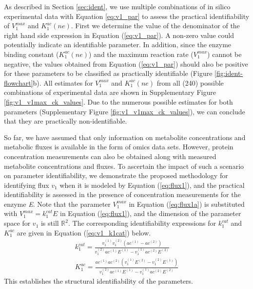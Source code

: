 \documentclass[10pt]{article}
\begin{document}
	As described in Section \ref{sec:ident}, we use multiple combinations of in silico experimental data with Equation \ref{eq:v1_par} to assess the practical identifiability of $V_1^{max}$ and $K_1^{ac} (ne)$. First we determine the value of the denominator of the right hand side expression in Equation (\ref{eq:v1_par}). A non-zero value could potentially indicate an identifiable parameter. In addition, since the enzyme binding constant ($K_1^{ac}(ne)$) and the maximum reaction rate ($V_1^{max}$) cannot be negative, the values obtained from Equation (\ref{eq:v1_par}) should also be positive for these parameters to be classified as practically identifiable (Figure \ref{fig:ident-flowchart}b). All estimates for $V_1^{max}$ and $K_1^{ac} (ne)$ from all (240) possible combinations of experimental data are shown in Supplementary Figure \ref{fig:v1_v1max_ck_values}. Due to the numerous possible estimates for both parameters (Supplementary Figure \ref{fig:v1_v1max_ck_values}), we can conclude that they are practically non-identifiable. 
	
	So far, we have assumed that only information on metabolite concentrations and metabolic fluxes is available in the form of omics data sets. However, protein concentration measurements can also be obtained along with measured metabolite concentrations and fluxes. To ascertain the impact of such a scenario on parameter identifiability, we demonstrate the proposed methodology for identifying flux $v_1$ when it is modeled by Equation (\ref{eq:flux1}), and the practical identifiability is assessed in the presence of concentration measurements for the enzyme \textit{E}. Note that the parameter $V_1^{max}$ in Equation (\ref{eq:flux1a}) is substituted with $V_1^{max} = k_1^{cat}E$ in Equation (\ref{eq:flux1}), and the dimension of the parameter space for $v_1$ is still $\mathbb{R}^2$. The corresponding identifiability expressions for $k_1^{cat}$ and $K_1^{ac}$ are given in Equation (\ref{eq:v1_k1cat}) below.	
	\begin{subequations}\label{eq:v1_k1cat}
		\begin{align}
		k_1^{cat} = \frac{ v_1^{(1)}v_1^{(2)} \left( ac^{(1)}- ac^{(2)}\right)}{v_1^{(2)}ac^{(1)}E^{(1)} - v_1^{(1)}ac^{(2)}E^{(2)}}\\
		K_1^{ac} = \frac{ac^{(1)}ac^{(2)}\left(v_1^{(1)}E^{(2)} - v_1^{(2)}E^{(1)}\right)}{v_1^{(2)}ac^{(1)}E^{(1)} - v_1^{(1)}ac^{(2)}E^{(2)}}
		\end{align}
	\end{subequations}		
	This establishes the structural identifiability of the parameters.
\end{document}

